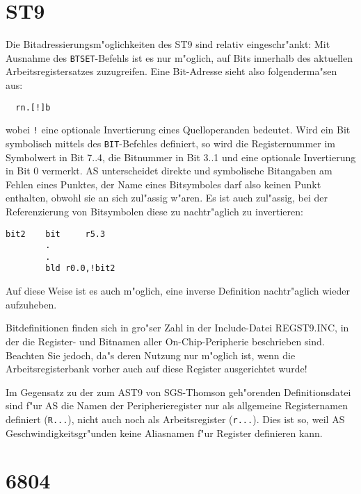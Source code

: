 \documentclass[12pt,a4paper,twoside]{report}
\newcommand{\tty}[1]{{\tt #1}}
\begin{document}

\section{ST9}

Die Bitadressierungsm"oglichkeiten des ST9 sind relativ eingeschr"ankt:
Mit Ausnahme des \tty{BTSET}-Befehls ist es nur m"oglich, auf Bits innerhalb
des aktuellen Arbeitsregistersatzes zuzugreifen.  Eine Bit-Adresse
sieht also folgenderma"sen aus:
\begin{verbatim}
  rn.[!]b
\end{verbatim}
wobei \verb?!? eine optionale Invertierung eines Quelloperanden bedeutet.
Wird ein Bit symbolisch mittels des \tty{BIT}-Befehles definiert, so wird
die Registernummer im Symbolwert in Bit 7..4, die Bitnummer in Bit
3..1 und eine optionale Invertierung in Bit 0 vermerkt.  AS unterscheidet
direkte und symbolische Bitangaben am Fehlen eines Punktes,
der Name eines Bitsymboles darf also keinen Punkt enthalten, obwohl
sie an sich zul"assig w"aren.  Es ist auch zul"assig, bei der Referenzierung
von Bitsymbolen diese zu nachtr"aglich zu invertieren:
\begin{verbatim}
bit2    bit     r5.3
        .
        .
        bld	r0.0,!bit2
\end{verbatim}
Auf diese Weise ist es auch m"oglich, eine inverse Definition nachtr"aglich
wieder aufzuheben.
\par
Bitdefinitionen finden sich in gro"ser Zahl in der Include-Datei
REGST9.INC, in der die Register- und Bitnamen aller On-Chip-Peripherie
beschrieben sind.  Beachten Sie jedoch, da"s deren Nutzung
nur m"oglich ist, wenn die Arbeitsregisterbank vorher auch auf diese
Register ausgerichtet wurde!
\par
Im Gegensatz zu der zum AST9 von SGS-Thomson geh"orenden Definitionsdatei
sind f"ur AS die Namen der Peripherieregister nur als allgemeine
Registernamen definiert (\tty{R...}), nicht auch noch als Arbeitsregister
(\tty{r...}).  Dies ist so, weil AS Geschwindigkeitsgr"unden keine
Aliasnamen f"ur Register definieren kann.


\section{6804}
\end{document}
